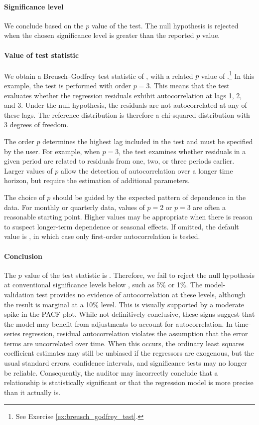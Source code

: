 \paragraph{Significance level} We conclude based on the $p$ value of the test. The null hypothesis is rejected when the chosen significance level is greater than the reported $p$ value.

\paragraph{Value of test statistic} We obtain a Breusch--Godfrey test statistic of \RegModThreeBg, with a related $p$ value of \RegModThreeBgP.\footnote{See Exercise \ref{ex:breusch_godfrey_test}.} 
In this example, the test is performed with order $p=3$.
This means that the test evaluates whether the regression residuals exhibit autocorrelation at lags 1, 2, and 3. 
Under the null hypothesis, the residuals are not autocorrelated at any of these lags. The reference distribution is therefore a chi-squared distribution with 3 degrees of freedom.

The order $p$ determines the highest lag included in the test and must be specified by the user. 
For example, when $p=3$, the test examines whether residuals in a given period are related to residuals from one, two, or three periods earlier. 
Larger values of $p$ allow the detection of autocorrelation over a longer time horizon, but require the estimation of additional parameters.

The choice of $p$ should be guided by the expected pattern of dependence in the data. 
For monthly or quarterly data, values of $p=2$ or $p=3$ are often a reasonable starting point. 
Higher values may be appropriate when there is reason to suspect longer-term dependence or seasonal effects. 
If omitted, the default value is , in which case only first-order autocorrelation is tested.

\paragraph{Conclusion}

The $p$ value of the test statistic is \RegModThreeBgP. Therefore, we fail to reject the null hypothesis at conventional significance levels below \RegModThreeBgP, such as 5\% or 1\%. The model-validation test provides no evidence of autocorrelation at these levels, although the result is marginal at a 10\% level.
This is visually supported by a moderate spike in the PACF plot. 
While not definitively conclusive, these signs suggest that the model may benefit from adjustments to account for autocorrelation. 
In time-series regression, residual autocorrelation violates the assumption that the error terms are uncorrelated over time. When this occurs, the ordinary least squares coefficient estimates may still be unbiased if the regressors are exogenous, but the usual standard errors, confidence intervals, and significance tests may no longer be reliable. 
Consequently, the auditor may incorrectly conclude that a relationship is statistically significant or that the regression model is more precise than it actually is.

